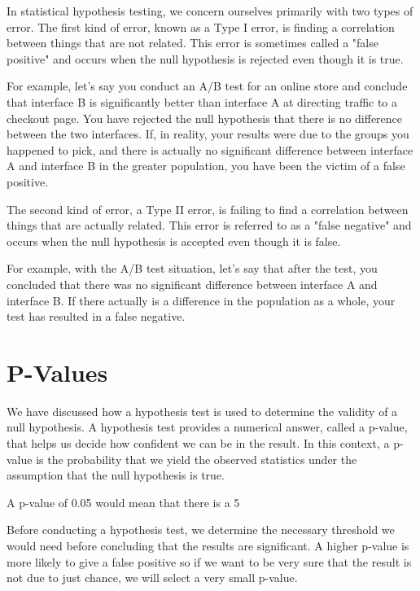 \documentclass{journal}
\begin{document}
In statistical hypothesis testing, we concern ourselves primarily with two types of error. The first kind of error, known as a Type I error, is finding a correlation between things that are not related. This error is sometimes called a "false positive" and occurs when the null hypothesis is rejected even though it is true.

For example, let's say you conduct an A/B test for an online store and conclude that interface B is significantly better than interface A at directing traffic to a checkout page. You have rejected the null hypothesis that there is no difference between the two interfaces. If, in reality, your results were due to the groups you happened to pick, and there is actually no significant difference between interface A and interface B in the greater population, you have been the victim of a false positive.

The second kind of error, a Type II error, is failing to find a correlation between things that are actually related. This error is referred to as a "false negative" and occurs when the null hypothesis is accepted even though it is false.

For example, with the A/B test situation, let's say that after the test, you concluded that there was no significant difference between interface A and interface B. If there actually is a difference in the population as a whole, your test has resulted in a false negative.

\section{P-Values}
We have discussed how a hypothesis test is used to determine the validity of a null hypothesis. A hypothesis test provides a numerical answer, called a p-value, that helps us decide how confident we can be in the result. In this context, a p-value is the probability that we yield the observed statistics under the assumption that the null hypothesis is true.

A p-value of 0.05 would mean that there is a 5%

Before conducting a hypothesis test, we determine the necessary threshold we would need before concluding that the results are significant. A higher p-value is more likely to give a false positive so if we want to be very sure that the result is not due to just chance, we will select a very small p-value.
\end{document}
